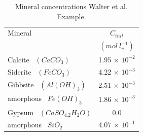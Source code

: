 \begin{table}
\caption{Mineral concentrations Walter et al. Example.}
\begin{center}
\begin{tabular}{ l c }
\hline
Mineral        & $C_{init}$  \\
                  & $(mol\ l^{-1}_{v})$  \\ \hline
Calcite \   $(CaCO_3)  $  & 1.95 $\times$ $10^{-2}$  \\
Siderite  \ $(FeCO_3)  $  & 4.22 $\times$ $10^{-3}$  \\
Gibbsite \ $(Al(OH)_3) $  & 2.51 $\times$ $10^{-3}$  \\
amorphous \ $Fe(OH)_3  $  & 1.86 $\times$ $10^{-3}$  \\
Gypsum \ $(CaSO_4.2H_2O) $ & 0.0                     \\
amorphous  \ $SiO_2    $  & 4.07 $\times$ $10^{-1}$  \\ \hline
\end{tabular}
\label{ex3_cmin}
\end{center}
\end{table}

